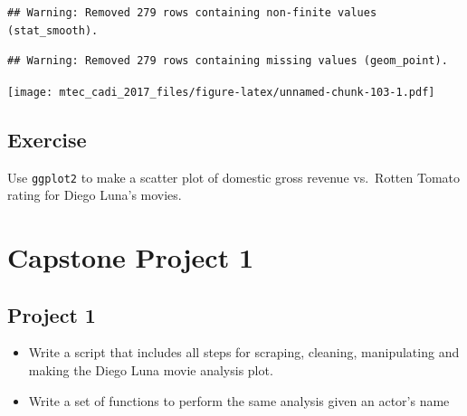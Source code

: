 \documentclass[12pt,]{book}
\newenvironment{Shaded}{\begin{snugshade}}{\end{snugshade}}
\newcommand{\KeywordTok}[1]{\textcolor[rgb]{0.13,0.29,0.53}{\textbf{#1}}}
\newcommand{\DataTypeTok}[1]{\textcolor[rgb]{0.13,0.29,0.53}{#1}}
\newcommand{\StringTok}[1]{\textcolor[rgb]{0.31,0.60,0.02}{#1}}
\newcommand{\OperatorTok}[1]{\textcolor[rgb]{0.81,0.36,0.00}{\textbf{#1}}}
\newcommand{\NormalTok}[1]{#1}
\theoremstyle{definition}
\theoremstyle{definition}
\theoremstyle{remark}
\begin{document}
\begin{Shaded}
\end{Shaded}

\begin{verbatim}
## Warning: Removed 279 rows containing non-finite values (stat_smooth).
\end{verbatim}

\begin{verbatim}
## Warning: Removed 279 rows containing missing values (geom_point).
\end{verbatim}

\texttt{[image: mtec\_cadi\_2017\_files/figure-latex/unnamed-chunk-103-1.pdf]}

\section{Exercise}\label{exercise-1}

Use \texttt{ggplot2} to make a scatter plot of domestic gross revenue
vs.~Rotten Tomato rating for Diego Luna's movies.

\chapter{Capstone Project 1}\label{capstone-project-1}

\section{Project 1}\label{project-1}

\begin{itemize}
\item
  Write a script that includes all steps for scraping, cleaning,
  manipulating and making the Diego Luna movie analysis plot.
\item
  Write a set of functions to perform the same analysis given an actor's
  name
\end{itemize}
\end{document}
